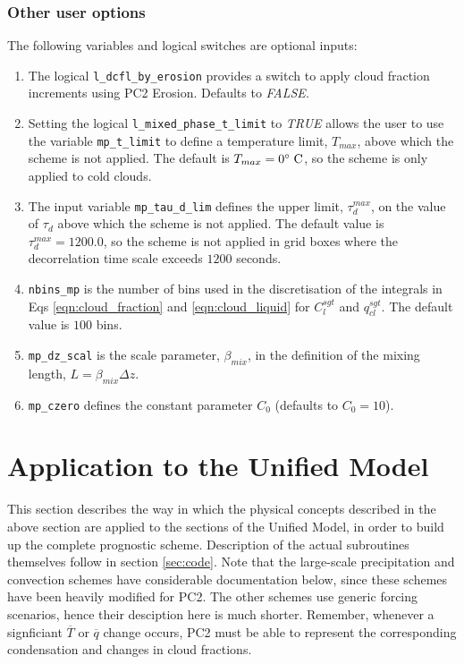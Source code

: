 \documentclass{UMDP_article}
\begin{document}
\subsubsection{Other user options}\label{sec:sgt_options}

The following variables and logical switches are optional inputs:
\begin{enumerate}
 \item The logical \verb!l_dcfl_by_erosion! provides a switch to
  apply cloud fraction increments using PC2 Erosion. Defaults to {\it FALSE}. 
 \item Setting the logical \verb!l_mixed_phase_t_limit! to {\it TRUE}
  allows the user to use the variable \verb!mp_t_limit! to define a temperature limit, $T_{max}$,
  above which the scheme is not applied. The default is $T_{max}=0^\circ\;{\rm C}$, so the
  scheme is only applied to cold clouds.
 \item The input variable \verb!mp_tau_d_lim! defines the
  upper limit, $\tau_d^{max}$, on the value of $\tau_d$ above which the scheme is not applied.
  The default value is $\tau_d^{max}=1200.0$, so the scheme is not applied in grid boxes
  where the decorrelation time scale exceeds $1200$ seconds.
 \item \verb!nbins_mp! is the number of bins used in the discretisation of the integrals in
  Eqs \ref{eqn:cloud_fraction} and \ref{eqn:cloud_liquid} for  $C_l^{sgt}$ and $q_{cl}^{sgt}$.
  The default value is $100$ bins.
 \item \verb!mp_dz_scal! is the scale parameter, $\beta_{mix}$, in the definition of the mixing length, $L=\beta_{mix}\Delta z$.
 \item \verb!mp_czero! defines the constant parameter $C_0$ (defaults to $C_0=10$). 
\end{enumerate}


\section{Application to the Unified Model}
\label{sec:app_um}

This section describes the way in which the physical concepts described in the above
section are applied to the sections of the Unified Model, in order to build
up the complete prognostic scheme. Description of the actual subroutines
themselves follow in section \ref{sec:code}.
Note that the large-scale precipitation
and convection schemes have considerable documentation below, since these
schemes have been heavily modified for PC2. The other schemes use generic
forcing scenarios, hence their desciption here is much shorter. Remember,
whenever a signficiant $\overline{T}$ or $\overline{q}$ change occurs,
PC2 must be able to
represent the corresponding condensation and changes in cloud fractions.
\end{document}

